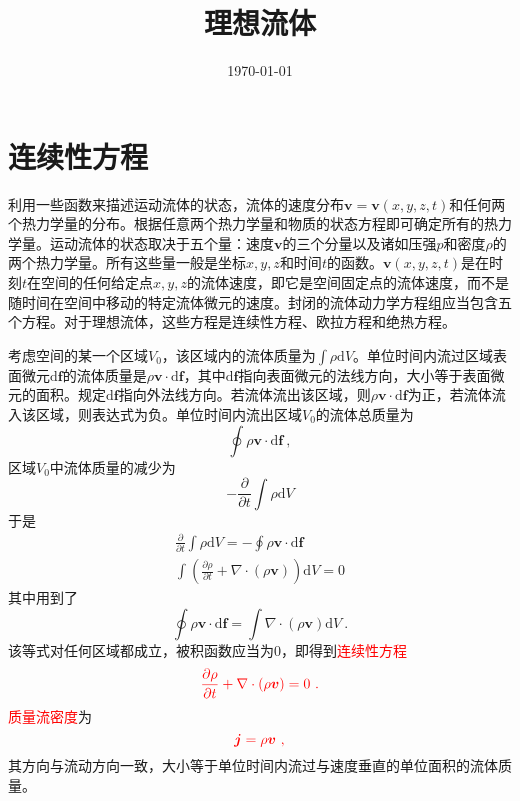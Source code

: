 \documentclass[12pt,a4paper]{article}
\title{理想流体}
\author{}
\date{\today}
\renewcommand{\vec}[1]{\boldsymbol{#1}}
\newcommand{\dif}{\mathrm{d}}
\begin{document}
\maketitle

\section{连续性方程}
利用一些函数来描述运动流体的状态，流体的速度分布$\vec{v} = \vec{v}(x, y, z, t)$和任何两个热力学量的分布。根据任意两个热力学量和物质的状态方程即可确定所有的热力学量。运动流体的状态取决于五个量：速度$\vec{v}$的三个分量以及诸如压强$p$和密度$\rho$的两个热力学量。所有这些量一般是坐标$x, y, z$和时间$t$的函数。$\vec{v}(x, y, z, t)$是在时刻$t$在空间的任何给定点$x, y, z$的流体速度，即它是空间固定点的流体速度，而不是随时间在空间中移动的特定流体微元的速度。封闭的流体动力学方程组应当包含五个方程。对于理想流体，这些方程是连续性方程、欧拉方程和绝热方程。

考虑空间的某一个区域$V_0$，该区域内的流体质量为$\int \rho \dif V$。单位时间内流过区域表面微元$\dif \vec{f}$的流体质量是$\rho \vec{v}\cdot \dif \vec{f}$，其中$\dif \vec{f}$指向表面微元的法线方向，大小等于表面微元的面积。规定$\dif \vec{f}$指向外法线方向。若流体流出该区域，则$\rho \vec{v}\cdot \dif \vec{f}$为正，若流体流入该区域，则表达式为负。单位时间内流出区域$V_0$的流体总质量为
\begin{equation*}
\oint \rho \vec{v}\cdot \dif \vec{f} ~,
\end{equation*}
区域$V_0$中流体质量的减少为
\begin{equation}
-\frac{\partial}{\partial t} \int \rho \dif V
\end{equation}
于是
\begin{align*}
\frac{\partial}{\partial t} \int \rho \dif V = -\oint \rho \vec{v} \cdot \dif \vec{f} \\
\int \left( \frac{\partial \rho}{\partial t}  + \nabla \cdot (\rho \vec{v}) \right) \dif V = 0
\end{align*}
其中用到了
\begin{equation*}
\oint \rho \vec{v} \cdot \dif \vec{f} = \int  \nabla \cdot (\rho \vec{v}) \dif V ~.
\end{equation*}
该等式对任何区域都成立，被积函数应当为$0$，即得到\textcolor{red}{连续性方程}
\begin{equation}
\color{red} \frac{\partial \rho}{\partial t}  + \nabla \cdot (\rho \vec{v}) = 0 ~.
\label{continuity}
\end{equation}
\textcolor{red}{质量流密度}为
\begin{equation}
\color{red} \vec{j} = \rho \vec{v} ~,
\end{equation}
其方向与流动方向一致，大小等于单位时间内流过与速度垂直的单位面积的流体质量。
\end{document}

